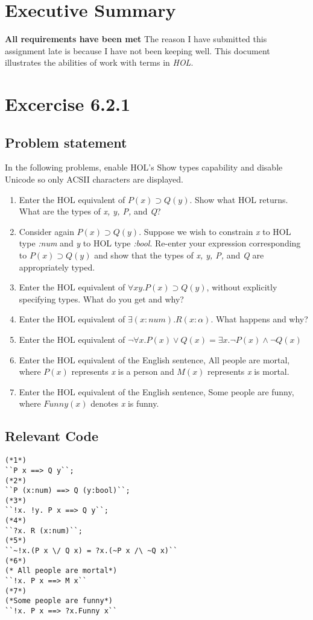 \documentclass{report}
\begin{document}
\chapter{Executive Summary}
\label{cha:executive-summary}

\textbf{All requirements have been met} 
The reason I have submitted this assignment late is because I have not been keeping well. This document illustrates the abilities of work with terms in \emph{HOL}.


\chapter{Excercise 6.2.1}
\label{cha:6.2.1}

\section{Problem statement}
\label{problem-statement-6.2.1}
In the following problems, enable HOL’s Show types capability and disable Unicode so only ACSII characters are displayed.
\begin{enumerate}
\item Enter the HOL equivalent of \emph{$P(x) \supset Q(y)$}. Show what HOL returns. What are the types of \emph{x, y, P,} and \emph{Q}?
\item Consider again \emph{$P(x) \supset Q(y)$}. Suppose we wish to constrain \emph{x} to HOL type \emph{:num} and \emph{y} to HOL type \emph{:bool}. Re-enter your expression corresponding to \emph{$P(x) \supset Q(y)$} and show that the types of \emph{x, y, P,} and \emph{Q} are appropriately typed.
\item Enter the HOL equivalent of \emph{$\forall x y.P(x) \supset Q(y)$}, without explicitly specifying types. What do you get and why?
\item Enter the HOL equivalent of \emph{$\exists ( x : num).R(x : \alpha)$}. What happens and why?
\item Enter the HOL equivalent of \emph{$\neg \forall x.P(x) \lor Q(x) = \exists x.\neg P(x) \land \neg Q(x)$}
\item Enter the HOL equivalent of the English sentence, All people are mortal, where \emph{$P(x)$} represents \emph{x} is a person and \emph{$M(x)$} represents \emph{x} is mortal.
\item Enter the HOL equivalent of the English sentence, Some people are funny, where \emph{$Funny(x)$} denotes \emph{x} is funny.
\end{enumerate}
\section{Relevant Code}
\label{rel-code-6.2.1}
\begin{lstlisting}[frame=TBlr]
(*1*)
``P x ==> Q y``;
(*2*)
``P (x:num) ==> Q (y:bool)``;
(*3*)
``!x. !y. P x ==> Q y``;
(*4*)
``?x. R (x:num)``;
(*5*)
``~!x.(P x \/ Q x) = ?x.(~P x /\ ~Q x)``
(*6*)
(* All people are mortal*)
``!x. P x ==> M x``
(*7*)
(*Some people are funny*)
``!x. P x ==> ?x.Funny x``
\end{lstlisting}
\end{document}
